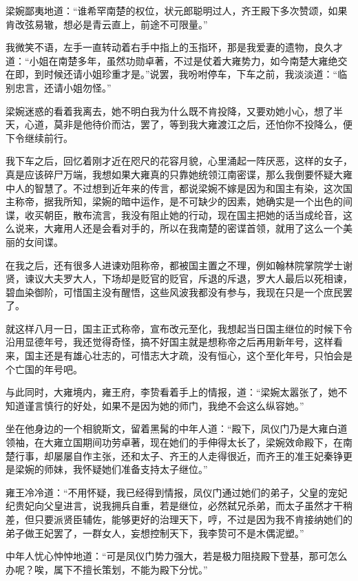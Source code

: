 梁婉鄙夷地道：“谁希罕南楚的权位，状元郎聪明过人，齐王殿下多次赞颂，如果肯改弦易辙，想必是青云直上，前途不可限量。”

我微笑不语，左手一直转动着右手中指上的玉指环，那是我爱妻的遗物，良久才道：“小姐在南楚多年，虽然功勋卓著，不过是仗着大雍势力，如今南楚大雍绝交在即，到时候还请小姐珍重才是。”说罢，我吩咐停车，下车之前，我淡淡道：“临别忠言，还请小姐勿怪。”

梁婉迷惑的看着我离去，她不明白我为什么既不肯投降，又要劝她小心，想了半天，心道，莫非是他待价而沽，罢了，等到我大雍渡江之后，还怕你不投降么，便下令继续前行。

我下车之后，回忆着刚才近在咫尺的花容月貌，心里涌起一阵厌恶，这样的女子，真是应该碎尸万端，我想如果大雍真的只靠她统领江南密谍，那么我倒要怀疑大雍中人的智慧了。不过想到近年来的传言，都说梁婉不嫁是因为和国主有染，这次国主称帝，据我所知，梁婉的暗中运作，是不可缺少的因素，她确实是一个出色的间谍，收买朝臣，散布流言，我没有阻止她的行动，现在国主把她的话当成纶音，这么说来，大雍用人还是会看对手的，所以在我南楚的密谍首领，就用了这么一个美丽的女间谍。

在我之后，还有很多人进谏劝阻称帝，都被国主置之不理，例如翰林院掌院学士谢贤，谏议大夫罗大人，下场却是贬官的贬官，斥退的斥退，罗大人最后以死相谏，碧血染御阶，可惜国主没有醒悟，这些风波我都没有参与，我现在只是一个庶民罢了。

就这样八月一日，国主正式称帝，宣布改元至化，我想起当日国主继位的时候下令沿用显德年号，我还觉得奇怪，搞不好国主就是想称帝之后再用新年号，这样看来，国主还是有雄心壮志的，可惜志大才疏，没有恒心，这个至化年号，只怕会是个亡国的年号吧。

与此同时，大雍境内，雍王府，李贽看着手上的情报，道：“梁婉太嚣张了，她不知道谨言慎行的好处，如果不是因为她的师门，我绝不会这么纵容她。”

坐在他身边的一个相貌斯文，留着黑髯的中年人道：“殿下，凤仪门乃是大雍白道领袖，在大雍立国期间功劳卓著，现在她们的手伸得太长了，梁婉效命殿下，在南楚行事，却屡屡自作主张，还和太子、齐王的人走得很近，而齐王的准王妃秦铮更是梁婉的师妹，我怀疑她们准备支持太子继位。”

雍王冷冷道：“不用怀疑，我已经得到情报，凤仪门通过她们的弟子，父皇的宠妃纪贵妃向父皇进言，说我拥兵自重，若是继位，必然弑兄杀弟，而太子虽然才干稍差，但只要派贤臣辅佐，能够更好的治理天下，哼，不过是因为我不肯接纳她们的弟子做王妃罢了，一群女人，妄想控制天下，我李贽可不是木偶泥塑。”

中年人忧心忡忡地道：“可是凤仪门势力强大，若是极力阻挠殿下登基，那可怎么办呢？唉，属下不擅长策划，不能为殿下分忧。”

